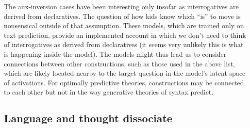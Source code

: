 \documentclass[output=paper,colorlinks,citecolor=brown
]{langscibook}
\begin{document}
The aux-inversion cases have been interesting only insofar as interrogatives are derived from declaratives. The question of how kids know which ``is'' to move is nonsensical outside of that assumption. These models, which are trained only on text prediction, provide an implemented account in which we don't need to think of interrogatives as derived from declaratives (it seems very unlikely this is what is happening inside the model). The models might thus lead us to consider connections between other constructions, such as those used in the above list, which are likely located nearby to the target question in the model's latent space of activations. For optimally predictive theories, constructions may be connected to each other but not in the way generative theories of syntax predict.
   





\subsection{Language and thought dissociate}
\end{document}
